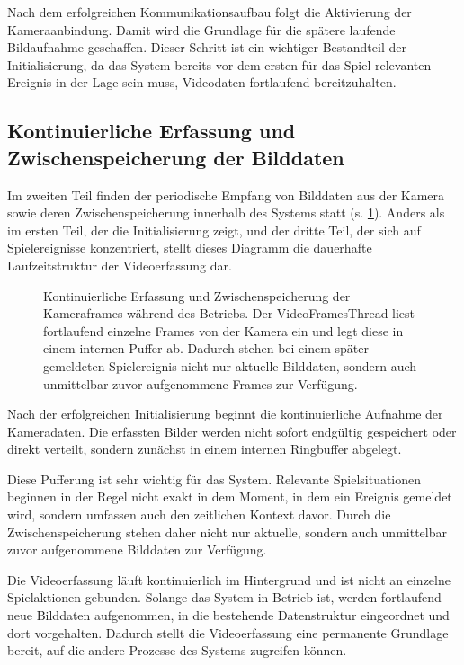 Nach dem erfolgreichen Kommunikationsaufbau folgt die Aktivierung der Kameraanbindung. Damit wird die Grundlage für die spätere laufende Bildaufnahme geschaffen. Dieser Schritt ist ein wichtiger Bestandteil der Initialisierung, 
da das System bereits vor dem ersten für das Spiel relevanten Ereignis in der Lage sein muss, Videodaten fortlaufend bereitzuhalten.

\subsection{Kontinuierliche Erfassung und Zwischenspeicherung der Bilddaten}

Im zweiten Teil finden der periodische Empfang von Bilddaten aus der Kamera sowie deren Zwischenspeicherung innerhalb des Systems statt (s. \cref{fig:dartsequenz2}). Anders als im ersten Teil, der die Initialisierung zeigt, und der dritte Teil, der sich auf Spielereignisse konzentriert, 
stellt dieses Diagramm die dauerhafte Laufzeitstruktur der Videoerfassung dar.

\begin{figure}[h!]%
    \centering
    {\small
    }
    \caption[Erfassung und Zwischenspeicherung der Kamerframes]{Kontinuierliche Erfassung und Zwischenspeicherung der Kameraframes während des Betriebs. Der VideoFramesThread liest fortlaufend einzelne Frames von der Kamera ein und legt diese in einem internen Puffer ab. 
    Dadurch stehen bei einem später gemeldeten Spielereignis nicht nur aktuelle Bilddaten, sondern auch unmittelbar zuvor aufgenommene Frames zur Verfügung.}
    \label{fig:dartsequenz2}
\end{figure}

Nach der erfolgreichen Initialisierung beginnt die kontinuierliche Aufnahme der Kameradaten. Die erfassten Bilder werden nicht sofort endgültig gespeichert oder direkt verteilt, sondern zunächst in einem internen Ringbuffer abgelegt.

Diese Pufferung ist sehr wichtig für das System. Relevante Spielsituationen beginnen in der Regel nicht exakt in dem Moment, in dem ein Ereignis gemeldet wird, sondern umfassen auch den zeitlichen Kontext davor. Durch die Zwischenspeicherung stehen daher nicht nur aktuelle, 
sondern auch unmittelbar zuvor aufgenommene Bilddaten zur Verfügung.

Die Videoerfassung läuft kontinuierlich im Hintergrund und ist nicht an einzelne Spielaktionen gebunden. Solange das System in Betrieb ist, werden fortlaufend neue Bilddaten aufgenommen, in die bestehende Datenstruktur eingeordnet und dort vorgehalten. 
Dadurch stellt die Videoerfassung eine permanente Grundlage bereit, auf die andere Prozesse des Systems zugreifen können.

